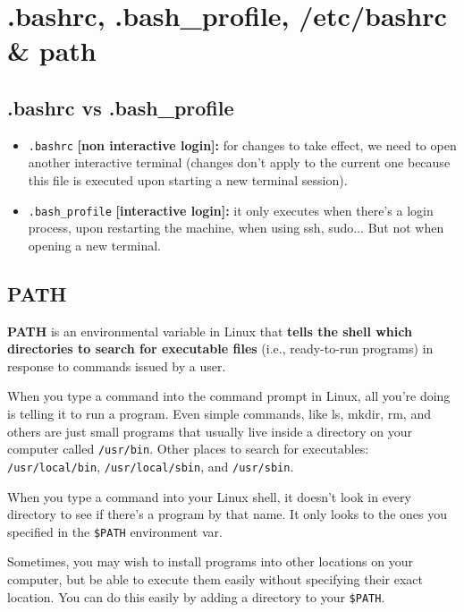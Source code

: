 \documentclass{article}
\begin{document}
\newpage
\section{.bashrc, .bash\_profile, /etc/bashrc \& path}

\subsection{.bashrc vs .bash\_profile}

\begin{itemize}
    \item \verb|.bashrc| \textbf{[non interactive login]:} for changes to take effect, we need to open another interactive terminal (changes don't apply to the current one because this file is executed upon starting a new terminal session).
    \item \verb|.bash_profile| \textbf{[interactive login]:} it only executes when there's a login process, upon restarting the machine, when using ssh, sudo... But not when opening a new terminal.
\end{itemize}

\subsection{PATH}
\textbf{PATH} is an environmental variable in Linux that \textbf{tells the shell which directories to search for executable files} (i.e., ready-to-run programs) in response to commands issued by a user.

When you type a command into the command prompt in Linux, all you're doing is telling it to run a program. Even simple commands, like ls, mkdir, rm, and others are just small programs that usually live inside a directory on your computer called \verb|/usr/bin|. Other places to search for executables: \verb+/usr/local/bin+, \verb+/usr/local/sbin+, and \verb+/usr/sbin+. 

When you type a command into your Linux shell, it doesn't look in every directory to see if there's a program by that name. It only looks to the ones you specified in the \verb|$PATH| environment var.

Sometimes, you may wish to install programs into other locations on your computer, but be able to execute them easily without specifying their exact location. You can do this easily by adding a directory to your \verb|$PATH|.
\end{document}
